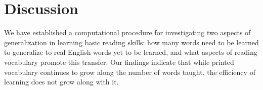 \documentclass[10pt,letterpaper]{article}
\newcommand{\exword}[1]{\MakeUppercase{#1}}
\begin{document}
%


\section{Discussion}
We have established a computational procedure for investigating two aspects of generalization in learning basic reading skills: how many words need to be learned to generalize to real English words yet to be learned, and what aspects of reading vocabulary promote this transfer.  Our findings indicate that while printed vocabulary continues to grow along the number of words taught, the efficiency of learning does not grow along with it.
\end{document}
